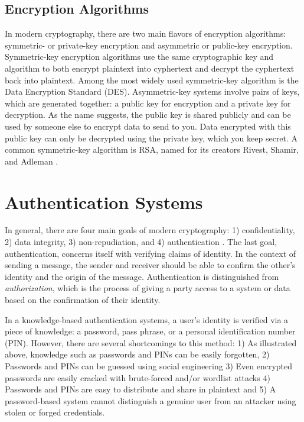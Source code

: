 \documentclass[11pt]{article}
\begin{document}
\subsection{Encryption Algorithms}
In modern cryptography, there are two main flavors of encryption algorithms: 
symmetric- or private-key encryption and asymmetric or public-key encryption.
Symmetric-key encryption algorithms use the same cryptographic key and algorithm to
both encrypt plaintext into cyphertext and decrypt the cyphertext back into
plaintext. Among the most widely used symmetric-key algorithm is the Data 
Encryption Standard (DES). Asymmetric-key systems involve pairs of keys, which
are generated together: a public key for encryption and a private key for 
decryption. As the name suggests, the public key is shared publicly and can
be used by someone else to encrypt data to send to you. Data encrypted with this 
public key can only be decrypted using the private key, which you keep secret.
A common symmetric-key algorithm is RSA, named for its creators Rivest, 
Shamir, and Adleman \cite{Biocryptography10}.

\section{Authentication Systems}
In general, there are four main goals of modern cryptography: 1) 
confidentiality, 2) data integrity, 3) non-repudiation, and 4) 
authentication \cite{Biocryptography10}. The last goal, authentication, concerns
itself with verifying claims of identity. In the context of sending a message, 
the sender and receiver should be able to confirm the other's identity and 
the origin of the message. Authentication is distinguished from 
\textit{authorization}, which is the process of giving a party access to a
system or data based on the confirmation of their identity.

In a knowledge-based authentication systems, a user's identity is verified 
via a piece of knowledge: a password, pass phrase, or a personal 
identification number (PIN). However, there are several shortcomings to this
method: 1) As illustrated above, knowledge such as passwords and PINs can be 
easily forgotten, 2) Passwords and PINs can be guessed using social engineering
3) Even encrypted passwords are easily cracked with brute-forced and/or 
wordlist attacks 4) Passwords and PINs are easy to distribute and share in 
plaintext and 5) A password-based system cannot distinguish a genuine user from
an attacker using stolen or forged credentials.
\end{document}
